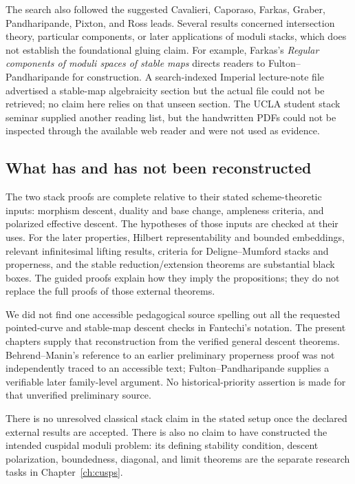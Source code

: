 \begin{description}[style=nextline]
\item[Other leads and inaccessible material.]
The search also followed the suggested Cavalieri, Caporaso,
Farkas, Graber, Pandharipande, Pixton, and Ross leads.
Several results concerned intersection theory, particular
components, or later applications of moduli stacks, which
does not establish the foundational gluing claim. For example,
Farkas's \emph{Regular components of moduli spaces of stable
maps} directs readers to Fulton--Pandharipande for construction.
A search-indexed Imperial lecture-note file advertised a
stable-map algebraicity section but the actual file could not
be retrieved; no claim here relies on that unseen section.
The UCLA student stack seminar supplied another reading list,
but the handwritten PDFs could not be inspected through the
available web reader and were not used as evidence.
\end{description}

\subsection{What has and has not been reconstructed}

The two stack proofs are complete relative to their stated
scheme-theoretic inputs: morphism descent, duality and base
change, ampleness criteria, and polarized effective descent.
The hypotheses of those inputs are checked at their uses.
For the later properties, Hilbert representability and bounded
embeddings, relevant infinitesimal lifting results, criteria
for Deligne--Mumford stacks and properness, and the stable
reduction/extension theorems are substantial black boxes.
The guided proofs explain how they imply the propositions;
they do not replace the full proofs of those external theorems.

We did not find one accessible pedagogical source spelling out
all the requested pointed-curve and stable-map descent checks
in Fantechi's notation. The present chapters supply that
reconstruction from the verified general descent theorems.
Behrend--Manin's reference to an earlier preliminary properness
proof was not independently traced to an accessible text;
Fulton--Pandharipande supplies a verifiable later family-level
argument. No historical-priority assertion is made for that
unverified preliminary source.

There is no unresolved classical stack claim in the stated
setup once the declared external results are accepted. There
is also no claim to have constructed the intended cuspidal
moduli problem: its defining stability condition, descent
polarization, boundedness, diagonal, and limit theorems are
the separate research tasks in Chapter~\ref{ch:cusps}.
